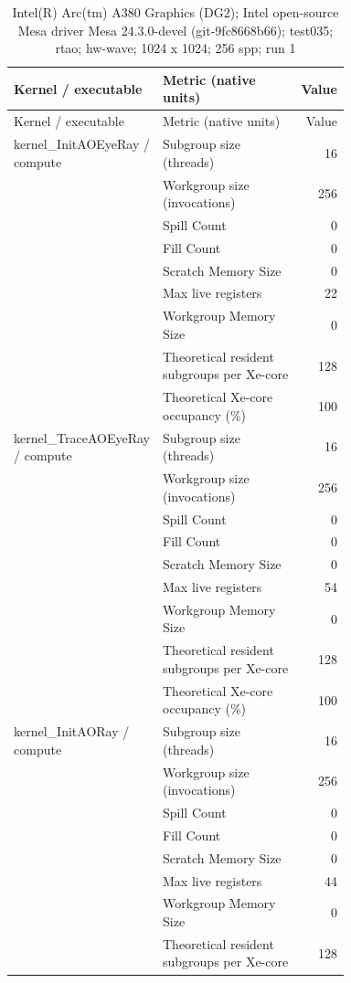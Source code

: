 \begin{longtable}{p{0.30\linewidth}p{0.43\linewidth}r}
\caption{Intel(R) Arc(tm) A380 Graphics (DG2); Intel open-source Mesa driver Mesa 24.3.0-devel (git-9fc8668b66); test035; rtao; hw-wave; 1024 x 1024; 256 spp; run 1}\label{tab:hydra-profile-7}\\
\hline Kernel / executable & Metric (native units) & Value \\\hline
\endfirsthead
\hline Kernel / executable & Metric (native units) & Value \\\hline
\endhead
kernel\_InitAOEyeRay / compute & Subgroup size (threads) & 16 \\
 & Workgroup size (invocations) & 256 \\
 & Spill Count & 0 \\
 & Fill Count & 0 \\
 & Scratch Memory Size & 0 \\
 & Max live registers & 22 \\
 & Workgroup Memory Size & 0 \\
 & Theoretical resident subgroups per Xe-core & 128 \\
 & Theoretical Xe-core occupancy (\%) & 100 \\
\hline
kernel\_TraceAOEyeRay / compute & Subgroup size (threads) & 16 \\
 & Workgroup size (invocations) & 256 \\
 & Spill Count & 0 \\
 & Fill Count & 0 \\
 & Scratch Memory Size & 0 \\
 & Max live registers & 54 \\
 & Workgroup Memory Size & 0 \\
 & Theoretical resident subgroups per Xe-core & 128 \\
 & Theoretical Xe-core occupancy (\%) & 100 \\
\hline
kernel\_InitAORay / compute & Subgroup size (threads) & 16 \\
 & Workgroup size (invocations) & 256 \\
 & Spill Count & 0 \\
 & Fill Count & 0 \\
 & Scratch Memory Size & 0 \\
 & Max live registers & 44 \\
 & Workgroup Memory Size & 0 \\
 & Theoretical resident subgroups per Xe-core & 128 \\

\end{longtable}
